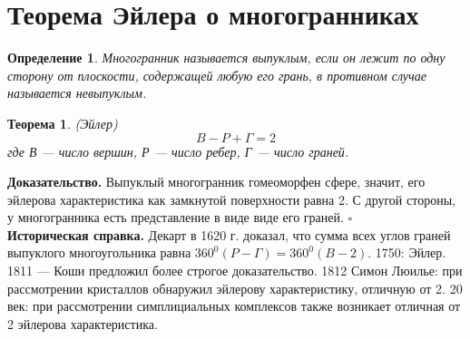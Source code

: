 \documentclass[a4paper]{article}
\newtheorem{defin}{Определение}
\newtheorem{theor}{Теорема}
\begin{document}
\section{Теорема Эйлера о многогранниках}
\begin{defin}
Многогранник называется выпуклым, если он лежит по одну сторону от
плоскости, содержащей любую его грань, в противном случае называется 
невыпуклым.
\end{defin}
\begin{theor} (Эйлер)\\
    $$B - P + \Gamma = 2$$ 
    где В --- число вершин, Р --- число ребер, Г --- число граней.
\end{theor}
\textbf{Доказательство.} Выпуклый многогранник гомеоморфен сфере, значит,
его эйлерова характеристика как замкнутой поверхности равна 2. С другой 
стороны, у многогранника есть представление в виде виде его граней. 
$\square$ \\
\textbf{Историческая справка.} Декарт в 1620 г. доказал, что сумма всех 
углов граней выпуклого многоугольника равна $360^0(P-\Gamma) = 
360^0(B - 2)$. 1750: Эйлер. 1811 --- Коши предложил более строгое
доказательство. 1812 Симон Люилье: при рассмотрении кристаллов обнаружил
эйлерову характеристику, отличную от 2. 20 век: при рассмотрении
симплициальных комплексов также возникает отличная от 2 эйлерова 
характеристика. 
\end{document}
